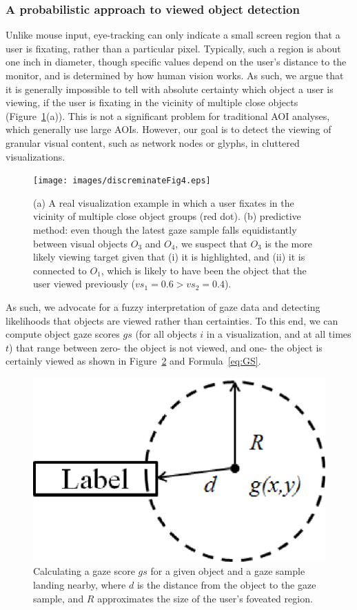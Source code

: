 \subsubsection{A probabilistic approach to viewed object detection}
\label{sec:ProbabilisticObjectDetection}
Unlike mouse input, eye-tracking can only indicate a small screen region that a user is fixating, rather than a particular pixel. Typically, such a region is about one inch in diameter, though specific values depend on the user's distance to the monitor, and is determined by how human vision works. As such, we argue that it is generally impossible to tell with absolute certainty which object a user is viewing, if the user is fixating in the vicinity of multiple close objects (Figure~\ref{fig:discreminateFig4}(a)). This is not a significant problem for traditional AOI analyses, which generally use large AOIs. However, our goal is to detect the viewing of granular visual content, such as network nodes or glyphs, in cluttered visualizations. 

\begin{figure}[htb]
  \centering
  \texttt{[image: images/discreminateFig4.eps]}
  \caption{(a) A real visualization example in which a user fixates in the vicinity of multiple close object groups (red dot). (b) predictive method: even though the latest gaze sample falls equidistantly between visual objects $O_3$ and $O_4$, we suspect that $O_3$ is the more likely viewing target given that (i) it is highlighted, and (ii) it is connected to $O_1$, which is likely to have been the object that the user viewed previously ($vs_1=0.6 > vs_2 = 0.4$). }
	\label{fig:discreminateFig4}
\end{figure}

As such, we advocate for a fuzzy interpretation of gaze data and detecting likelihoods that objects are viewed rather than certainties. To this end, we can compute object gaze scores $gs$ (for all objects $i$ in a visualization, and at all times $t$) that range between zero- the object is not viewed, and one- the object is certainly viewed as shown in Figure~\ref{fig:gazeScoreFig3} and Formula~\ref{eq:GS}. 

\begin{figure}[htb]
  \centering
  \includegraphics[width=0.5\linewidth]{images/gazeScoreFig3.eps}
  \caption{Calculating a gaze score $gs$ for a given object and a gaze sample landing nearby, where $d$ is the distance from the object to the gaze sample, and $R$ approximates the size of the user's foveated region.}
	\label{fig:gazeScoreFig3}
\end{figure}

